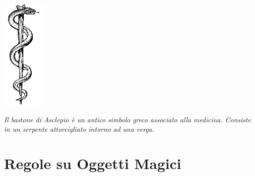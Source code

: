 \begin{center}
\includegraphics[width=0.2\linewidth]{immagini/Rod_of_asclepius.png}

\textit{Il bastone di Asclepio è un antico simbolo greco associato alla medicina. Consiste in un serpente attorcigliato intorno ad una verga.}
\end{center}


\pagebreak

\section{Regole su Oggetti Magici}\hypertarget{identificareom}{}

